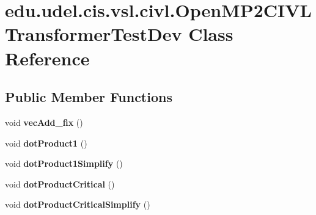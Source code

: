 \hypertarget{classedu_1_1udel_1_1cis_1_1vsl_1_1civl_1_1OpenMP2CIVLTransformerTestDev}{}\section{edu.\+udel.\+cis.\+vsl.\+civl.\+Open\+M\+P2\+C\+I\+V\+L\+Transformer\+Test\+Dev Class Reference}
\label{classedu_1_1udel_1_1cis_1_1vsl_1_1civl_1_1OpenMP2CIVLTransformerTestDev}
\subsection*{Public Member Functions}
\begin{DoxyCompactItemize}
\item 
\hypertarget{classedu_1_1udel_1_1cis_1_1vsl_1_1civl_1_1OpenMP2CIVLTransformerTestDev_a522398ed73a1fd4a1c08a462b0a92254}{}void {\bfseries vec\+Add\+\_\+fix} ()\label{classedu_1_1udel_1_1cis_1_1vsl_1_1civl_1_1OpenMP2CIVLTransformerTestDev_a522398ed73a1fd4a1c08a462b0a92254}

\item 
\hypertarget{classedu_1_1udel_1_1cis_1_1vsl_1_1civl_1_1OpenMP2CIVLTransformerTestDev_a6fadd9b7e4016f08f7ad6b0d23e7064d}{}void {\bfseries dot\+Product1} ()\label{classedu_1_1udel_1_1cis_1_1vsl_1_1civl_1_1OpenMP2CIVLTransformerTestDev_a6fadd9b7e4016f08f7ad6b0d23e7064d}

\item 
\hypertarget{classedu_1_1udel_1_1cis_1_1vsl_1_1civl_1_1OpenMP2CIVLTransformerTestDev_a9fa6e0e272ef719b1355801213689f5a}{}void {\bfseries dot\+Product1\+Simplify} ()\label{classedu_1_1udel_1_1cis_1_1vsl_1_1civl_1_1OpenMP2CIVLTransformerTestDev_a9fa6e0e272ef719b1355801213689f5a}

\item 
\hypertarget{classedu_1_1udel_1_1cis_1_1vsl_1_1civl_1_1OpenMP2CIVLTransformerTestDev_a41d258a057714c4e091e4444f58053da}{}void {\bfseries dot\+Product\+Critical} ()\label{classedu_1_1udel_1_1cis_1_1vsl_1_1civl_1_1OpenMP2CIVLTransformerTestDev_a41d258a057714c4e091e4444f58053da}

\item 
\hypertarget{classedu_1_1udel_1_1cis_1_1vsl_1_1civl_1_1OpenMP2CIVLTransformerTestDev_a7cd147efb4d40b68b58180f76952f084}{}void {\bfseries dot\+Product\+Critical\+Simplify} ()\label{classedu_1_1udel_1_1cis_1_1vsl_1_1civl_1_1OpenMP2CIVLTransformerTestDev_a7cd147efb4d40b68b58180f76952f084}


\end{DoxyCompactItemize}
